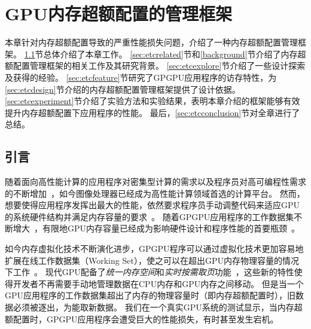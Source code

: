 \chapter{GPU内存超额配置的管理框架}
\label{chap:ETC}

本章针对内存超额配置导致的严重性能损失问题，介绍了一种内存超额配置管理框架。
\ref{sec:etcintroduction}节总体介绍了本章工作。
\ref{sec:etcrelated}节和\ref{background}节介绍了内存超额配置管理框架的相关工作及其研究背景。
\ref{sec:etcexplore}节介绍了一些设计探索及获得的经验。
\ref{sec:etcfeature}节研究了GPGPU应用程序的访存特性，为\ref{sec:etcdesign}节介绍的内存超额配置管理框架提供了设计依据。
\ref{sec:etcexperiment}节介绍了实验方法和实验结果，表明本章介绍的框架能够有效提升内存超额配置下应用程序的性能。
最后，\ref{sec:etcconclusion}节对全章进行了总结。


\section{引言}
\label{sec:etcintroduction}

随着面向高性能计算的应用程序对密集型计算的需求以及程序员对高可编程性需求的不断增加~，如今图像处理器已经成为高性能计算领域首选的计算平台。
然而，想要使得应用程序发挥出最大的性能，依然要求程序员手动调整代码来适应GPU的系统硬件结构并满足内存容量的要求~。
随着GPGPU应用程序的工作数据集不断增大~，有限地GPU内存容量已经成为影响硬件设计和程序性能的首要瓶颈~。

如今内存虚拟化技术不断演化进步，GPGPU程序可以通过虚拟化技术更加容易地扩展在线工作数据集（Working Set），使之可以在超出GPU内存物理容量的情况下工作~。
现代GPU配备了\emph{统一内存空间}和\emph{实时按需取页}功能~，这些新的特性使得开发者不再需要手动地管理数据在CPU内存和GPU内存之间移动。
但是当一个GPU应用程序的工作数据集超出了内存的物理容量时（即内存超额配置时），旧数据必须被逐出，为能取新数据。
我们在一个真实GPU系统的测试显示，当内存超额配置时，GPGPU应用程序会遭受巨大的性能损失，有时甚至发生宕机。

